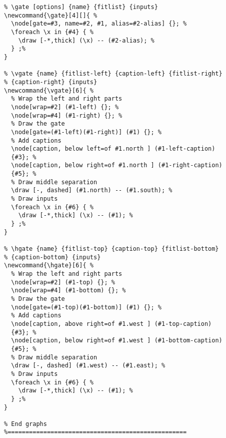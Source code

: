 \documentclass[a4paper]{article}
\begin{document}
\begin{lstlisting}
% \gate [options] {name} {fitlist} {inputs}
\newcommand{\gate}[4][]{ %
  \node[gate=#3, name=#2, #1, alias=#2-alias] {}; %
  \foreach \x in {#4} { %
    \draw [-*,thick] (\x) -- (#2-alias); %
  } ;%
}

% \vgate {name} {fitlist-left} {caption-left} {fitlist-right}
% {caption-right} {inputs}
\newcommand{\vgate}[6]{ %
  % Wrap the left and right parts
  \node[wrap=#2] (#1-left) {}; %
  \node[wrap=#4] (#1-right) {}; %
  % Draw the gate
  \node[gate=(#1-left)(#1-right)] (#1) {}; %
  % Add captions
  \node[caption, below left=of #1.north ] (#1-left-caption)
  {#3}; %
  \node[caption, below right=of #1.north ] (#1-right-caption)
  {#5}; %
  % Draw middle separation
  \draw [-, dashed] (#1.north) -- (#1.south); %
  % Draw inputs
  \foreach \x in {#6} { %
    \draw [-*,thick] (\x) -- (#1); %
  } ;%
}

% \hgate {name} {fitlist-top} {caption-top} {fitlist-bottom}
% {caption-bottom} {inputs}
\newcommand{\hgate}[6]{ %
  % Wrap the left and right parts
  \node[wrap=#2] (#1-top) {}; %
  \node[wrap=#4] (#1-bottom) {}; %
  % Draw the gate
  \node[gate=(#1-top)(#1-bottom)] (#1) {}; %
  % Add captions
  \node[caption, above right=of #1.west ] (#1-top-caption)
  {#3}; %
  \node[caption, below right=of #1.west ] (#1-bottom-caption)
  {#5}; %
  % Draw middle separation
  \draw [-, dashed] (#1.west) -- (#1.east); %
  % Draw inputs
  \foreach \x in {#6} { %
    \draw [-*,thick] (\x) -- (#1); %
  } ;%
}

% End graphs
%==================================================

\end{lstlisting}
\end{document}
